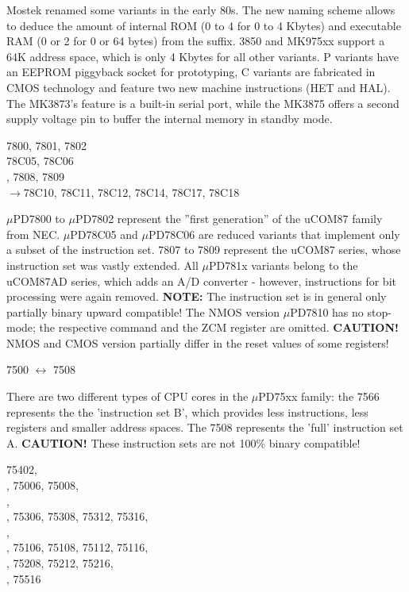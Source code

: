 \documentclass[12pt,twoside]{report}
\newcommand{\bb}[1]{{\bf #1}}
\begin{document}
Mostek renamed some variants in the early 80s.  The new naming scheme
allows to deduce the amount of internal ROM (0 to 4 for 0 to 4 Kbytes) 
and executable RAM (0 or 2 for 0 or 64 bytes) from the suffix.  3850
and MK975xx support a 64K address space, which is only 4 Kbytes for all
other variants.  P variants have an EEPROM piggyback socket for prototyping,
C variants are fabricated in CMOS technology and feature two new machine
instructions (HET and HAL). The MK3873's feature is a built-in serial port,
while the MK3875 offers a second supply voltage pin to buffer the internal
memory in standby mode.
\begin{cpulist}
   7800, 7801, 7802 \\
\> 78C05, 78C06 \\
, 7808, 7809 \\
$\rightarrow$78C10, 78C11, 78C12, 78C14, 78C17, 78C18
\end{cpulist}
$\mu$PD7800 to $\mu$PD7802 represent the ''first generation'' of the
uCOM87 family from NEC.  $\mu$PD78C05 and $\mu$PD78C06 are reduced
variants that implement only a subset of the instruction set. 7807 to
7809 represent the uCOM87 series, whose instruction set was vastly
extended.  All $\mu$PD781x variants belong to the uCOM87AD series, which
adds an A/D converter - however, instructions for bit processing were
again removed.  \bb{NOTE:} The instruction set is in general only
partially binary upward compatible! The NMOS version $\mu$PD7810 has
no stop-mode; the respective command and the ZCM register are omitted.
\bb{CAUTION!}  NMOS and CMOS version partially differ in the reset
values of some registers!
\begin{cpulist}
   7500 $\leftrightarrow$ 7508
\end{cpulist}
There are two different types of CPU cores in the $\mu$PD75xx
family: the 7566 represents the the 'instruction set B', which
provides less instructions, less registers and smaller address
spaces.  The 7508 represents the 'full' instruction set A.  {\bf
CAUTION!} These instruction sets are not 100\% binary compatible!
\begin{cpulist}
   75402,\\
, 75006, 75008,\\
,\\
, 75306, 75308, 75312, 75316,\\
,\\
, 75106, 75108, 75112, 75116,\\
, 75208, 75212, 75216,\\
, 75516
\end{cpulist}
\end{document}
